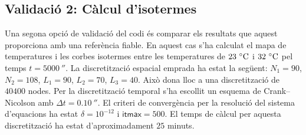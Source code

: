 
\clearpage
\subsection{Validació 2: Càlcul d'isotermes} \label{sec:validacio_02}

Una segona opció de validació del codi és comparar els resultats que aquest proporciona amb una referència fiable. En aquest cas s'ha calculat el mapa de temperatures i les corbes isotermes entre les temperatures de $23 \ \celsius$ i $32 \ \celsius$ pel temps $t = 5000 \ \second$. La discretització espacial emprada ha estat la següent: $N_1 = 90$, $N_2 = 108$, $L_1 = 90$, $L_2 = 70$, $L_3 = 40$. Això dona lloc a una discretització de $40400$ nodes. Per la discretització temporal s'ha escollit un esquema de Crank--Nicolson amb $\Delta t = 0.10 \ \second$. El criteri de convergència per la resolució del sistema d'equacions ha estat $\delta = 10^{-12}$ i $\textsf{itmax} = 500$. El temps de càlcul per aquesta discretització ha estat d'aproximadament $25$ minuts.

